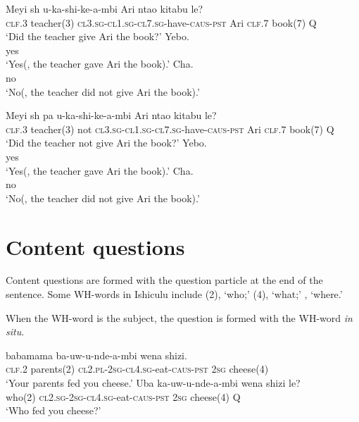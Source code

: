 \begin{exe}
\ex
\begin{xlist}
\ex
\gll Meyi {sh\textramshorns} u-ka-shi-ke-\textbeltl a-mbi Ari nta\textbeltl o kitabu le? \\
\textsc{clf.3} teacher(3) \textsc{cl3.sg}-\textsc{cl1.sg}-\textsc{cl7.sg}-have-\textsc{caus}-\textsc{pst} Ari \textsc{clf.7} book(7) Q \\
\trans `Did the teacher give Ari the book?'
\ex
\gll Yebo. \\
yes \\
\trans `Yes(, the teacher gave Ari the book).'
\ex
\gll Cha. \\
no \\
\trans `No(, the teacher did not give Ari the book).'
\end{xlist}
\ex
\begin{xlist}
\ex
\gll Meyi {sh\textramshorns} pa u-ka-shi-ke-\textbeltl a-mbi Ari nta\textbeltl o kitabu le? \\
\textsc{clf.3} teacher(3) not \textsc{cl3.sg}-\textsc{cl1.sg}-\textsc{cl7.sg}-have-\textsc{caus}-\textsc{pst} Ari \textsc{clf.7} book(7) Q \\
\trans `Did the teacher not give Ari the book?'
\ex
\gll Yebo. \\
yes \\
\trans `Yes(, the teacher gave Ari the book).'
\ex
\gll Cha. \\
no \\
\trans `No(, the teacher did not give Ari the book).'
\end{xlist}
\end{exe}

\section{Content questions}

Content questions are formed with the question particle \textit{} at the end of the sentence. Some WH-words in Ishiculu include \textit{}(2), `who;' \textit{}(4), `what;' \textit{}, `where.'

When the WH-word is the subject, the question is formed with the WH-word \textit{in situ}.

\begin{exe}
\ex
\begin{xlist}
\ex
{} babamama ba-uw-u-nde-\textipa{\textbeltl}a-mbi wena shizi. \\
\textsc{clf.2} parents(2) \textsc{cl2.pl}-\textsc{2sg}-\textsc{cl4.sg}-eat-\textsc{caus}-\textsc{pst} \textsc{2sg} cheese(4) \\
\trans `Your parents fed you cheese.'
\ex
\gll Uba ka-uw-u-nde-\textipa{\textbeltl}a-mbi wena shizi le? \\
who(2) \textsc{cl2.sg}-\textsc{2sg}-\textsc{cl4.sg}-eat-\textsc{caus}-\textsc{pst} \textsc{2sg} cheese(4) Q \\
\trans `Who fed you cheese?'
\end{xlist}
\end{exe}

